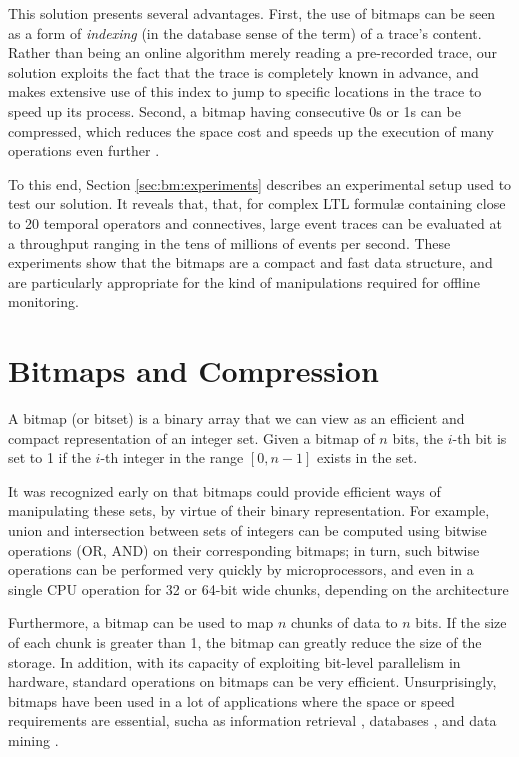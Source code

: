 This solution presents several advantages. First, the use of bitmaps can be seen as a form of \emph{indexing} (in the database sense of the term) of a trace's content. Rather than being an online algorithm merely reading a pre-recorded trace, our solution exploits the fact that the trace is completely known in advance, and makes extensive use of this index to jump to specific locations in the trace to speed up its process. Second, a bitmap having consecutive 0s or 1s can be compressed, which reduces the space cost and speeds up the execution of many operations even further \citep{lemire2014}.

To this end, Section \ref{sec:bm:experiments} describes an experimental setup used to test our solution. It reveals that, that, for complex LTL formul\ae{} containing close to 20 temporal operators and connectives, large event traces can be evaluated at a throughput ranging in the tens of millions of events per second. These experiments show that the bitmaps are a compact and fast data structure, and are particularly appropriate for the kind of manipulations required for offline monitoring.


\section{Bitmaps and Compression}\label{sec:bm:compression} %

A bitmap (or bitset) is a binary array that we can view as an efficient and compact representation of an integer set. Given a bitmap of $n$ bits, the $i$-th bit is set to 1 if the $i$-th integer in the range $[0, n-1]$ exists in the set.

It was recognized early on that bitmaps could provide efficient ways of manipulating these sets, by virtue of their binary representation. For example, union and intersection between sets of integers can be computed using bitwise operations (OR, AND) on their corresponding bitmaps; in turn, such bitwise operations can be performed very quickly by microprocessors, and even in a single CPU operation for 32 or 64-bit wide chunks, depending on the architecture

Furthermore, a bitmap can be used to map $n$ chunks of data to $n$ bits. If the size of each chunk is greater than 1, the bitmap can greatly reduce the size of the storage. In addition, with its capacity of exploiting bit-level parallelism in hardware, standard operations on bitmaps can be very efficient. Unsurprisingly, bitmaps have been used in a lot of applications where the space or speed requirements are essential, sucha as information retrieval \cite{Chan:1998:BID:276305.276336}, databases \cite{burdick2001mafia}, and data mining \cite{Ayres:2002:SPM:775047.775109,Uno:2005:LVC:1133905.1133916}.

